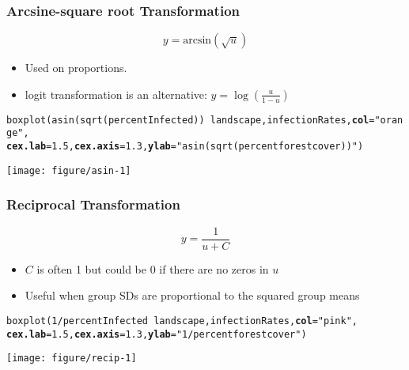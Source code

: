\documentclass[color=usenames,dvipsnames]{beamer}\usepackage[]{graphicx}\usepackage[]{color}
\makeatletter
\newcommand{\hlnum}[1]{\textcolor[rgb]{0.69,0.494,0}{#1}}%
\newcommand{\hlstr}[1]{\textcolor[rgb]{0.749,0.012,0.012}{#1}}%
\newcommand{\hlopt}[1]{\textcolor[rgb]{0,0,0}{#1}}%
\newcommand{\hlstd}[1]{\textcolor[rgb]{0,0,0}{#1}}%
\newcommand{\hlkwc}[1]{\textcolor[rgb]{0,0,0}{\textbf{#1}}}%
\newcommand{\hlkwd}[1]{\textcolor[rgb]{0.004,0.004,0.506}{#1}}%
\newenvironment{kframe}{%
 \def\at@end@of@kframe{}%
 \ifinner\ifhmode%
  \def\at@end@of@kframe{\end{minipage}}%
  \begin{minipage}{\columnwidth}%
 \fi\fi%
 \def\FrameCommand##1{\hskip\@totalleftmargin \hskip-\fboxsep
 \colorbox{shadecolor}{##1}\hskip-\fboxsep
     \hskip-\linewidth \hskip-\@totalleftmargin \hskip\columnwidth}%
 \MakeFramed {\advance\hsize-\width
   \@totalleftmargin\z@ \linewidth\hsize
   \@setminipage}}%
 {\par\unskip\endMakeFramed%
 \at@end@of@kframe}
\newenvironment{knitrout}{}{} %
\makeatother
\begin{document}
\begin{frame}[fragile]
  \frametitle{Arcsine-square root Transformation}
  \[
  y = \mathrm{arcsin}(\sqrt{u})
  \]
  \begin{itemize}%
    \small
    \item Used on proportions.
    \item logit transformation is an alternative: $y = \log(\frac{u}{1-u})$
  \end{itemize}
\begin{knitrout}\scriptsize
{}\color{fgcolor}\begin{kframe}
\begin{alltt}
\hlkwd{boxplot}\hlstd{(}\hlkwd{asin}\hlstd{(}\hlkwd{sqrt}\hlstd{(percentInfected))}\hlopt{~}\hlstd{landscape, infectionRates,} \hlkwc{col}\hlstd{=}\hlstr{"orange"}\hlstd{,}
        \hlkwc{cex.lab}\hlstd{=}\hlnum{1.5}\hlstd{,} \hlkwc{cex.axis}\hlstd{=}\hlnum{1.3}\hlstd{,} \hlkwc{ylab}\hlstd{=}\hlstr{"asin(sqrt(percent forest cover))"}\hlstd{)}
\end{alltt}
\end{kframe}

{\centering \texttt{[image: figure/asin-1]} 

}



\end{knitrout}
\end{frame}




\begin{frame}[fragile]
  \frametitle{Reciprocal Transformation}
  \[
  y = \frac{1}{u + C}
  \]
  \begin{itemize}%
    \small
    \item $C$ is often 1 but could be 0 if there are no zeros in $u$
    \item Useful when group SDs are proportional to the squared group means
  \end{itemize}
\begin{knitrout}\scriptsize
{}\color{fgcolor}\begin{kframe}
\begin{alltt}
\hlkwd{boxplot}\hlstd{(}\hlnum{1}\hlopt{/}\hlstd{percentInfected}\hlopt{~}\hlstd{landscape, infectionRates,} \hlkwc{col}\hlstd{=}\hlstr{"pink"}\hlstd{,}
        \hlkwc{cex.lab}\hlstd{=}\hlnum{1.5}\hlstd{,} \hlkwc{cex.axis}\hlstd{=}\hlnum{1.3}\hlstd{,} \hlkwc{ylab}\hlstd{=}\hlstr{"1/percent forest cover"}\hlstd{)}
\end{alltt}
\end{kframe}

{\centering \texttt{[image: figure/recip-1]} 

}



\end{knitrout}
\end{frame}
\end{document}
